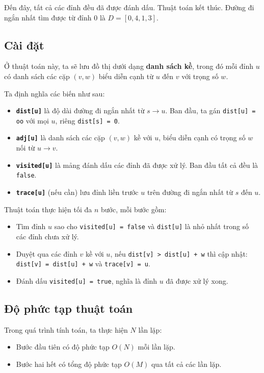 Đến đây, tất cả các đỉnh đều đã được đánh dấu. Thuật toán kết thúc. Đường đi ngắn nhất tìm được từ đỉnh $0$ là $D = [0, 4, 1, 3]$.

\subsection{Cài đặt}

Ở thuật toán này, ta sẽ lưu đồ thị dưới dạng \textbf{danh sách kề}, trong đó mỗi đỉnh $u$ có danh sách các cặp $(v, w)$ biểu diễn cạnh từ $u$ đến $v$ với trọng số $w$.

Ta định nghĩa các biến như sau:
\begin{itemize}
    \item \textbf{\texttt{dist[u]}} là độ dài đường đi ngắn nhất từ $s \to u$. Ban đầu, ta gán \texttt{dist[u] = oo} với mọi $u$, riêng \texttt{dist[s] = 0}.
    \item \textbf{\texttt{adj[u]}} là danh sách các cặp $(v, w)$ kề với $u$, biểu diễn cạnh có trọng số $w$ nối từ $u \to v$.
    \item \textbf{\texttt{visited[u]}} là mảng đánh dấu các đỉnh đã được xử lý. Ban đầu tất cả đều là \texttt{false}.
    \item \textbf{\texttt{trace[u]}} (nếu cần) lưu đỉnh liền trước $u$ trên đường đi ngắn nhất từ $s$ đến $u$.
\end{itemize}

Thuật toán thực hiện tối đa $n$ bước, mỗi bước gồm:
\begin{itemize}
    \item Tìm đỉnh $u$ sao cho \texttt{visited[u] = false} và \texttt{dist[u]} là nhỏ nhất trong số các đỉnh chưa xử lý.
    \item Duyệt qua các đỉnh $v$ kề với $u$, nếu \texttt{dist[v] > dist[u] + w} thì cập nhật: \\
    \texttt{dist[v] = dist[u] + w} và \texttt{trace[v] = u}.
    \item Đánh dấu \texttt{visited[u] = true}, nghĩa là đỉnh $u$ đã được xử lý xong.
\end{itemize}

\subsection{Độ phức tạp thuật toán}

Trong quá trình tính toán, ta thực hiện $N$ lần lặp:
\begin{itemize}
    \item Bước đầu tiên có độ phức tạp $O(N)$ mỗi lần lặp.
    \item Bước hai hết có tổng độ phức tạp $O(M)$ qua tất cả các lần lặp.
\end{itemize}

